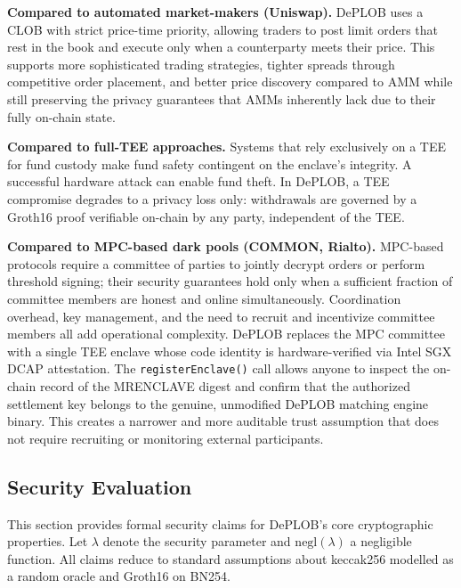 \documentclass[12pt,a4paper]{article}
\begin{document}
\textbf{Compared to automated market-makers (Uniswap).} DePLOB uses a CLOB with strict price-time priority, allowing traders to post limit orders that rest in the book and execute only when a counterparty meets their price. This supports more sophisticated trading strategies, tighter spreads through competitive order placement, and better price discovery compared to AMM while still preserving the privacy guarantees that AMMs inherently lack due to their fully on-chain state.

\textbf{Compared to full-TEE approaches.} Systems that rely exclusively on a TEE for fund custody make fund safety contingent on the enclave's integrity. A successful hardware attack can enable fund theft. In DePLOB, a TEE compromise degrades to a privacy loss only: withdrawals are governed by a Groth16 proof verifiable on-chain by any party, independent of the TEE.

\textbf{Compared to MPC-based dark pools (COMMON, Rialto).} MPC-based protocols require a committee of parties to jointly decrypt orders or perform threshold signing; their security guarantees hold only when a sufficient fraction of committee members are honest and online simultaneously. Coordination overhead, key management, and the need to recruit and incentivize committee members all add operational complexity. DePLOB replaces the MPC committee with a single TEE enclave whose code identity is hardware-verified via Intel SGX DCAP attestation. The \texttt{registerEnclave()} call allows anyone to inspect the on-chain record of the MRENCLAVE digest and confirm that the authorized settlement key belongs to the genuine, unmodified DePLOB matching engine binary. This creates a narrower and more auditable trust assumption that does not require recruiting or monitoring external participants.

\subsection{Security Evaluation}

This section provides formal security claims for DePLOB's core cryptographic properties. Let $\lambda$ denote the security parameter and $\mathrm{negl}(\lambda)$ a negligible function. All claims reduce to standard assumptions about keccak256 modelled as a random oracle and Groth16 on BN254.
\end{document}
